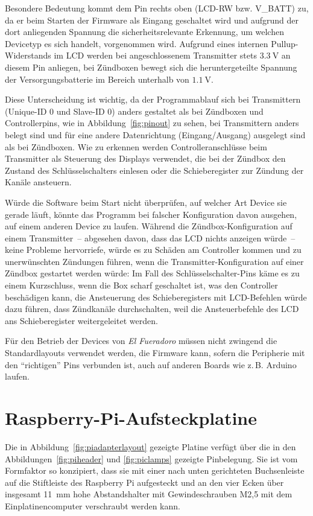 \documentclass[paper=a4, parskip, numbers=noenddot, toc=listof, headsepline]{scrbook}
\newcommand{\anlage}{\emph{El Fueradoro}}
\begin{document}
				Besondere Bedeutung kommt dem Pin rechts oben (LCD-RW bzw. V\_BATT) zu, da er beim Starten der Firmware als Eingang geschaltet wird und aufgrund der dort anliegenden Spannung die sicherheitsrelevante Erkennung, um welchen Devicetyp es sich handelt, vorgenommen wird. Aufgrund eines internen Pullup-Widerstands im LCD werden bei angeschlossenem Transmitter stets $\SI{3,3}{\volt}$ an diesem Pin anliegen, bei Zündboxen bewegt sich die heruntergeteilte Spannung der Versorgungsbatterie im Bereich unterhalb von $\SI{1,1}{\volt}$.

				Diese Unterscheidung ist wichtig, da der Programmablauf sich bei Transmittern (Unique-ID 0 und Slave-ID 0) anders gestaltet als bei Zündboxen und Controllerpins, wie in Abbildung~\ref{fig:pinout} zu sehen, bei Transmittern anders belegt sind und für eine andere Datenrichtung (Eingang/Ausgang) ausgelegt sind als bei Zündboxen.  Wie zu erkennen werden Controlleranschlüsse beim Transmitter als Steuerung des Displays verwendet, die bei der Zündbox den Zustand des Schlüsselschalters einlesen oder die Schieberegister zur Zündung der Kanäle ansteuern.

				Würde die Software beim Start nicht überprüfen, auf welcher Art Device sie gerade läuft, könnte das Programm bei falscher Konfiguration davon ausgehen, auf einem anderen Device zu laufen. Während die Zündbox-Konfiguration auf einem Transmitter~-- abgesehen davon, dass das LCD nichts anzeigen würde~-- keine Probleme hervorriefe, würde es zu Schäden am Controller kommen und zu unerwünschten Zündungen führen, wenn die Transmitter-Konfiguration auf einer Zündbox gestartet werden würde: Im Fall des Schlüsselschalter-Pins käme es  zu einem Kurzschluss, wenn die Box scharf geschaltet ist, was den Controller beschädigen kann, die Ansteuerung des Schieberegisters mit LCD-Befehlen würde dazu führen, dass Zündkanäle durchschalten, weil die Ansteuerbefehle des LCD ans Schieberegister weitergeleitet werden.

				Für den Betrieb der Devices von {\anlage} müssen nicht zwingend die Standardlayouts verwendet werden, die Firmware kann, sofern die Peripherie mit den \enquote{richtigen} Pins verbunden ist, auch auf anderen Boards wie z.\,B. Arduino laufen.

			\section{Raspberry-Pi-Aufsteckplatine}

				Die in Abbildung~\ref{fig:piadapterlayout} gezeigte Platine verfügt über die in den Abbildungen~\ref{fig:piheader} und \ref{fig:piclamps} gezeigte Pinbelegung. Sie ist vom Formfaktor so konzipiert, dass sie mit einer nach unten gerichteten Buchsenleiste auf die Stiftleiste des Raspberry Pi aufgesteckt und an den vier Ecken über insgesamt \SI{11}{\milli\metre} hohe Abstandshalter mit Gewindeschrauben M2,5 mit dem Einplatinencomputer verschraubt werden kann.
\end{document}
